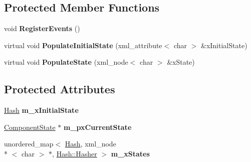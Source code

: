 \subsection*{Protected Member Functions}
\begin{DoxyCompactItemize}
\item 
\hypertarget{class_k_g_e_1_1_component_state_machine_a5a0193964976a9cdbf7df765bb77c444}{void {\bfseries Register\-Events} ()}\label{class_k_g_e_1_1_component_state_machine_a5a0193964976a9cdbf7df765bb77c444}

\item 
\hypertarget{class_k_g_e_1_1_component_state_machine_a4b4662d44a1b659ebf6cf9504f82c4b9}{virtual void {\bfseries Populate\-Initial\-State} (xml\-\_\-attribute$<$ char $>$ \&x\-Initial\-State)}\label{class_k_g_e_1_1_component_state_machine_a4b4662d44a1b659ebf6cf9504f82c4b9}

\item 
\hypertarget{class_k_g_e_1_1_component_state_machine_a518cd4b1c2c8af852109f2ffb7e9b3ae}{virtual void {\bfseries Populate\-State} (xml\-\_\-node$<$ char $>$ \&x\-State)}\label{class_k_g_e_1_1_component_state_machine_a518cd4b1c2c8af852109f2ffb7e9b3ae}

\end{DoxyCompactItemize}
\subsection*{Protected Attributes}
\begin{DoxyCompactItemize}
\item 
\hypertarget{class_k_g_e_1_1_component_state_machine_a8c59f416a93dc7eec37fb6cd0b90d488}{\hyperlink{class_k_g_e_1_1_hash}{Hash} {\bfseries m\-\_\-x\-Initial\-State}}\label{class_k_g_e_1_1_component_state_machine_a8c59f416a93dc7eec37fb6cd0b90d488}

\item 
\hypertarget{class_k_g_e_1_1_component_state_machine_a37c5962df358e40bd8c0807c0dd143ec}{\hyperlink{class_k_g_e_1_1_component_state}{Component\-State} $\ast$ {\bfseries m\-\_\-px\-Current\-State}}\label{class_k_g_e_1_1_component_state_machine_a37c5962df358e40bd8c0807c0dd143ec}

\item 
\hypertarget{class_k_g_e_1_1_component_state_machine_a6a9b3302a8b0b76c7bf6292683dd3b78}{unordered\-\_\-map$<$ \hyperlink{class_k_g_e_1_1_hash}{Hash}, xml\-\_\-node\\*
$<$ char $>$ $\ast$, \hyperlink{struct_k_g_e_1_1_hash_1_1_hasher}{Hash\-::\-Hasher} $>$ {\bfseries m\-\_\-x\-States}}\label{class_k_g_e_1_1_component_state_machine_a6a9b3302a8b0b76c7bf6292683dd3b78}

\end{DoxyCompactItemize}

